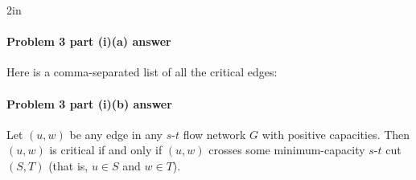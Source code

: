 
\vfill

\begin{answerBox}{2in}          %

  \paragraph{Problem 3 part (i)(a) answer}

  \bigskip 

  
  Here is a comma-separated list of all the critical edges:
  \BLUE{
    \[
      \REPLACEME
    \]}

\end{answerBox}

\newpage

\paragraph{Problem 3 part (i)(b) answer}


\begin{lemma}\label{lemma: problem 3 i}
  Let $(u, w)$ be any edge in any $s$-$t$ flow network $G$ with positive capacities.
  Then $(u, w)$ is critical if and only if $(u, w)$ crosses some minimum-capacity $s$-$t$ cut $(S, T)$
  (that is, $u\in S$ and $w\in T$).
\end{lemma}

